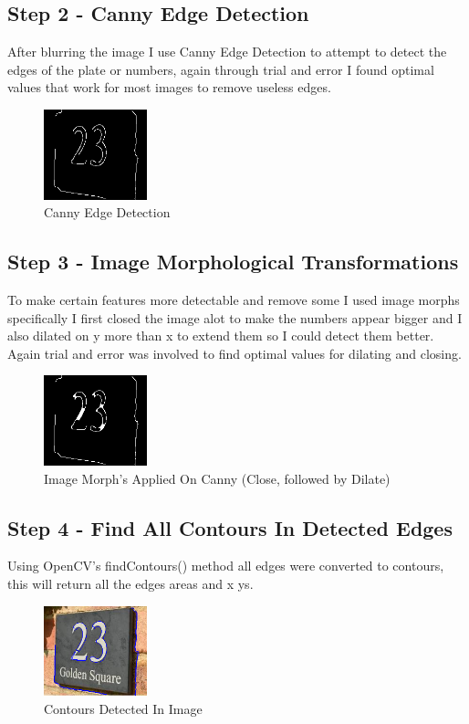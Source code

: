 \documentclass[conference]{IEEEtran}
\begin{document}
\subsection{Step 2 - Canny Edge Detection}
After blurring the image I use Canny Edge Detection to attempt to detect the edges of the plate or numbers, again through
trial and error I found optimal values that work for most images to remove useless edges.
\begin{figure}[!htbp]
    \centerline{{\includegraphics[width=30mm, scale=0.5]{edges.png}}}
    \caption{Canny Edge Detection}
    \label{fig}
\end{figure}
\subsection{Step 3 - Image Morphological Transformations}
To make certain features more detectable and remove some I used image morphs specifically I first closed the image alot to
make the numbers appear bigger and I also dilated on y more than x to extend them so I could detect them better. Again trial
and error was involved to find optimal values for dilating and closing.
\begin{figure}[!htbp]
    \centerline{{\includegraphics[width=30mm, scale=0.5]{morph.png}}}
    \caption{Image Morph's Applied On Canny (Close, followed by Dilate)}
    \label{fig}
\end{figure}
\subsection{Step 4 - Find All Contours In Detected Edges}
Using OpenCV's findContours() method all edges were converted to contours, this will return all the edges areas and x ys.
\begin{figure}[!htbp]
    \centerline{{\includegraphics[width=30mm, scale=0.5]{contours.png}}}
    \caption{Contours Detected In Image}
    \label{fig}
\end{figure}
\clearpage
\end{document}
